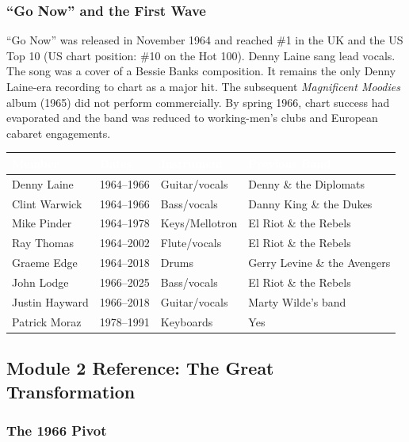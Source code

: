 \documentclass[11pt,letterpaper]{article}
\newcommand{\tableheader}[1]{\textbf{\sffamily\textcolor{white}{#1}}}
\begin{document}
\subsubsection{``Go Now'' and the First Wave}

``Go Now'' was released in November 1964 and reached \#1 in the UK and the US Top 10 (US chart position: \#10 on the Hot 100). Denny Laine sang lead vocals. The song was a cover of a Bessie Banks composition. It remains the only Denny Laine-era recording to chart as a major hit. The subsequent \textit{Magnificent Moodies} album (1965) did not perform commercially. By spring 1966, chart success had evaporated and the band was reduced to working-men's clubs and European cabaret engagements.

\begin{center}
\begin{tabularx}{\textwidth}{L{3cm}L{3cm}L{2.5cm}X}
\toprule
{}
\tableheader{Member} & \tableheader{Dates} & \tableheader{Instrument} & \tableheader{Previous Band} \\
\midrule
Denny Laine & 1964--1966 & Guitar/vocals & Denny \& the Diplomats \\
Clint Warwick & 1964--1966 & Bass/vocals & Danny King \& the Dukes \\
Mike Pinder & 1964--1978 & Keys/Mellotron & El Riot \& the Rebels \\
Ray Thomas & 1964--2002 & Flute/vocals & El Riot \& the Rebels \\
Graeme Edge & 1964--2018 & Drums & Gerry Levine \& the Avengers \\
John Lodge & 1966--2025 & Bass/vocals & El Riot \& the Rebels \\
Justin Hayward & 1966--2018 & Guitar/vocals & Marty Wilde's band \\
Patrick Moraz & 1978--1991 & Keyboards & Yes \\
\bottomrule
\end{tabularx}
\end{center}

\subsection{Module 2 Reference: The Great Transformation}

\subsubsection{The 1966 Pivot}
\end{document}
